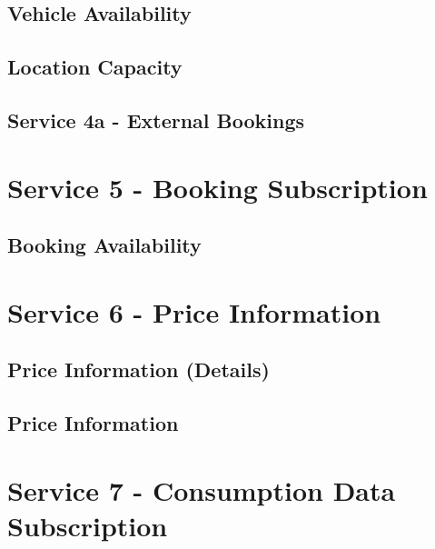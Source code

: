 \subsection*{Vehicle Availability}



\subsection*{Location Capacity}



\subsection*{Service 4a - External Bookings}
\label{sec:Datenmodell:Dienst4a}



\section{Service 5 - Booking Subscription}
\label{sec:Datenmodell:Dienst5}

\subsection*{Booking Availability}



\section{Service 6 - Price Information}
\label{sec:Datenmodell:Dienst6}

\subsection*{Price Information (Details)}



\subsection*{Price Information}



\section{Service 7 - Consumption Data Subscription}
\label{sec:Datenmodell:Dienst7}

